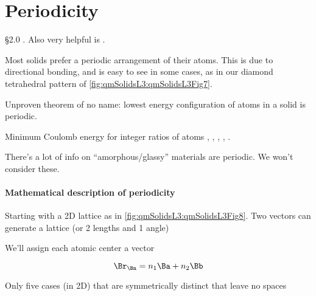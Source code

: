 %
%

\section{Periodicity}

\reading \S 2.0 \citep{ibach2009solid}.  Also very helpful is \citep{tung:bravais}.

Most solids prefer a periodic arrangement of their atoms.  This is due to directional bonding, and is easy to see in some cases, as in our diamond tetrahedral pattern of \cref{fig:qmSolidsL3:qmSolidsL3Fig7}.


Unproven theorem of no name: lowest energy configuration of atoms in a solid is periodic.

Minimum Coulomb energy for integer ratios of atoms
,
,
,
,
.

There's a lot of info on ``amorphous/glassy'' materials are  periodic.  We won't consider these.

\paragraph{Mathematical description of periodicity}

Starting with a 2D lattice as in \cref{fig:qmSolidsL3:qmSolidsL3Fig8}.  Two vectors can generate a lattice (or 2 lengths and 1 angle)


We'll assign each atomic center a vector

\begin{dmath}\label{eqn:condensedMatterLecture3:100}
\Br_\Bn = n_1 \Ba + n_2 \Bb
\end{dmath}

Only five cases (in 2D) that are symmetrically distinct that leave no spaces

